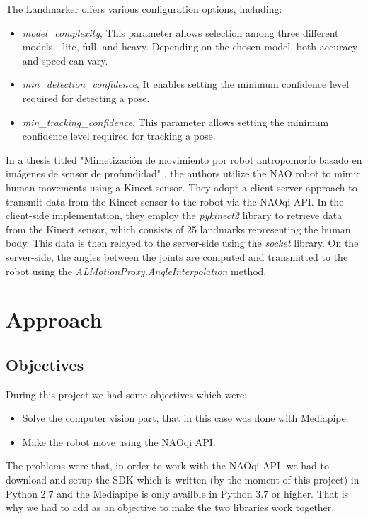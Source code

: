 \documentclass[conference]{IEEEtran}
\begin{document}
The Landmarker offers various configuration options, including:

\begin{itemize}
\item \textit{model\_complexity}, This parameter allows selection among three different models - lite, full, and heavy. Depending on the chosen model, both accuracy and speed can vary.
\item \textit{min\_detection\_confidence}, It enables setting the minimum confidence level required for detecting a pose.
\item \textit{min\_tracking\_confidence}, This parameter allows setting the minimum confidence level required for tracking a pose.
\end{itemize}

In a thesis titled "Mimetización de movimiento por robot antropomorfo basado en imágenes de sensor de profundidad" \cite{b3}, the authors utilize the NAO robot to mimic human movements using a Kinect sensor. They adopt a client-server approach to transmit data from the Kinect sensor to the robot via the NAOqi API. In the client-side implementation, they employ the \textit{pykinect2} library to retrieve data from the Kinect sensor, which consists of 25 landmarks representing the human body. This data is then relayed to the server-side using the \textit{socket} library. On the server-side, the angles between the joints are computed and transmitted to the robot using the \textit{ALMotionProxy.AngleInterpolation} method.


\section{Approach}
\subsection{Objectives}

During this project we had some objectives which were:
\begin{itemize}
\item Solve the computer vision part, that in this case was done with Mediapipe.
\item Make the robot move using the NAOqi API.

\end{itemize}
The problems were that, in order to work with the NAOqi API, we had to download and setup the SDK which is written (by the moment of this project) in Python 2.7 and the Mediapipe is only availble in Python 3.7 or higher. That is why we had to add as an objective to make the two libraries work together.
\end{document}
